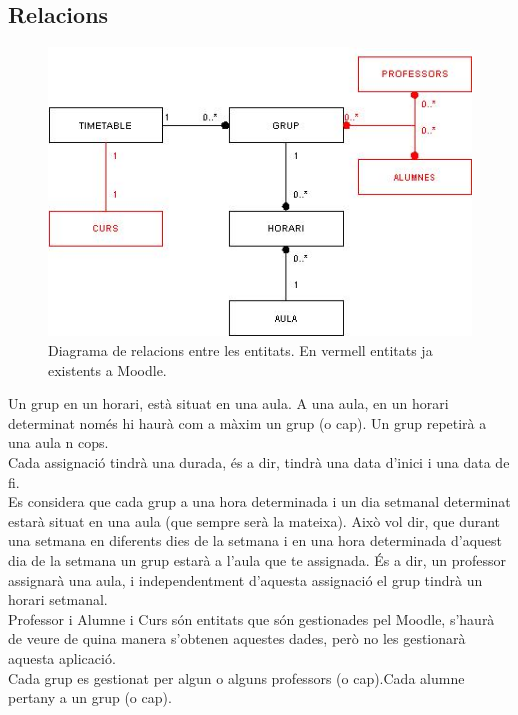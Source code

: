\documentclass[a4paper]{report}  %
\begin{document}
\subsection{Relacions}\label{relacions-1r}
		\begin{figure}[H] %
		\begin{center}
		\includegraphics[width=14cm,keepaspectratio]{img/DiagramaRelacions-1r.jpg}
		\caption[List caption]{Diagrama de relacions entre les entitats. En vermell entitats ja existents a Moodle.}
		\label{fig:DiagramaRelacions-1r}
		\end{center}
		\end{figure}
Un grup en un horari, està situat en una aula. A una aula, en un horari determinat només hi haurà com a màxim un grup (o cap). Un grup repetirà a una aula n cops.\\
Cada assignació tindrà una durada, és a dir, tindrà una data d’inici i una data de fi.\\
Es considera que cada grup a una hora determinada i un dia setmanal  determinat estarà situat en una aula (que sempre serà la mateixa). Això vol dir, que durant una setmana en diferents dies de la setmana i en una hora determinada d’aquest dia de la setmana un grup estarà a l’aula que te assignada. És a dir, un professor assignarà una aula, i independentment d’aquesta assignació el grup tindrà un horari setmanal.\\
Professor i Alumne i Curs són entitats que són gestionades pel Moodle, s’haurà de veure de quina manera s’obtenen aquestes dades, però no les gestionarà aquesta aplicació.\\
Cada grup es gestionat per algun o alguns professors (o cap).Cada alumne pertany a un grup (o cap).
\end{document}
